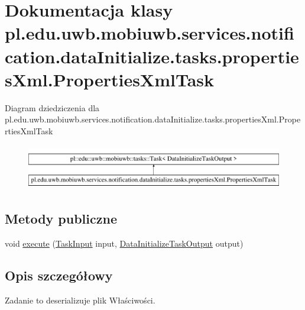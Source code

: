 \hypertarget{classpl_1_1edu_1_1uwb_1_1mobiuwb_1_1services_1_1notification_1_1data_initialize_1_1tasks_1_1propdc60fe894b08dca88ecfd120106f4e52}{}\section{Dokumentacja klasy pl.\+edu.\+uwb.\+mobiuwb.\+services.\+notification.\+data\+Initialize.\+tasks.\+properties\+Xml.\+Properties\+Xml\+Task}
\label{classpl_1_1edu_1_1uwb_1_1mobiuwb_1_1services_1_1notification_1_1data_initialize_1_1tasks_1_1propdc60fe894b08dca88ecfd120106f4e52}
Diagram dziedziczenia dla pl.\+edu.\+uwb.\+mobiuwb.\+services.\+notification.\+data\+Initialize.\+tasks.\+properties\+Xml.\+Properties\+Xml\+Task\begin{figure}[H]
\begin{center}
\leavevmode
\includegraphics[height=2.000000cm]{classpl_1_1edu_1_1uwb_1_1mobiuwb_1_1services_1_1notification_1_1data_initialize_1_1tasks_1_1propdc60fe894b08dca88ecfd120106f4e52}
\end{center}
\end{figure}
\subsection*{Metody publiczne}
\begin{DoxyCompactItemize}
\item 
void \hyperlink{classpl_1_1edu_1_1uwb_1_1mobiuwb_1_1services_1_1notification_1_1data_initialize_1_1tasks_1_1propdc60fe894b08dca88ecfd120106f4e52_a6faacd4cb1a08dd1342d4449b39a017c}{execute} (\hyperlink{classpl_1_1edu_1_1uwb_1_1mobiuwb_1_1tasks_1_1models_1_1_task_input}{Task\+Input} input, \hyperlink{classpl_1_1edu_1_1uwb_1_1mobiuwb_1_1services_1_1notification_1_1data_initialize_1_1_data_initialize_task_output}{Data\+Initialize\+Task\+Output} output)
\end{DoxyCompactItemize}


\subsection{Opis szczegółowy}
Zadanie to deserializuje plik Właściwości. 

